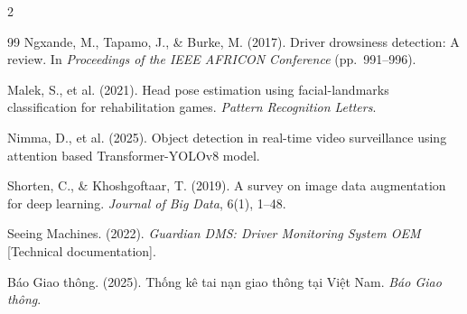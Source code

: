\documentclass[10pt]{article}
\begin{document}
\begin{multicols}{2}
\begin{thebibliography}{99}
 Ngxande, M., Tapamo, J., \& Burke, M. (2017). Driver drowsiness detection: A review. In \textit{Proceedings of the IEEE AFRICON Conference} (pp.~991--996).

 Malek, S., et al. (2021). Head pose estimation using facial-landmarks classification for rehabilitation games. \textit{Pattern Recognition Letters}.

 Nimma, D., et al. (2025). Object detection in real-time video surveillance using attention based Transformer-YOLOv8 model.

 Shorten, C., \& Khoshgoftaar, T. (2019). A survey on image data augmentation for deep learning. \textit{Journal of Big Data}, 6(1), 1--48.

 Seeing Machines. (2022). \textit{Guardian DMS: Driver Monitoring System OEM} [Technical documentation].

 Báo Giao thông. (2025). Thống kê tai nạn giao thông tại Việt Nam. \textit{Báo Giao thông}.

\end{thebibliography}

\end{multicols}
\end{document}
